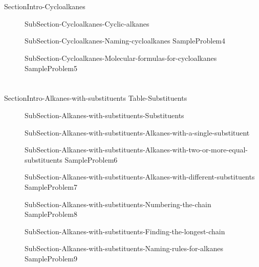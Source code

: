 \documentclass[main.tex]{subfiles}
\begin{document}
\section{\color{blue!30!black}{Cycloalkanes}}
{SectionIntro-Cycloalkanes}
\sloppy\begin{description}

\item[] {SubSection-Cycloalkanes-Cyclic-alkanes}
\item[]{SubSection-Cycloalkanes-Naming-cycloalkanes}
{SampleProblem4}
\item[]{SubSection-Cycloalkanes-Molecular-formulas-for-cycloalkanes}
{SampleProblem5}
\end{description}


 
\section{\color{blue!30!black}{Alkanes with substituents}}
{SectionIntro-Alkanes-with-substituents}
{Table-Substituents}
\sloppy\begin{description}
\item[]{SubSection-Alkanes-with-substituents-Substituents}
\item[]{SubSection-Alkanes-with-substituents-Alkanes-with-a-single-substituent}
\item[]{SubSection-Alkanes-with-substituents-Alkanes-with-two-or-more-equal-substituents}
{SampleProblem6}
\item[]{SubSection-Alkanes-with-substituents-Alkanes-with-different-substituents}
{SampleProblem7}
\item[]{SubSection-Alkanes-with-substituents-Numbering-the-chain}
{SampleProblem8}
\item[]{SubSection-Alkanes-with-substituents-Finding-the-longest-chain}
\item[]{SubSection-Alkanes-with-substituents-Naming-rules-for-alkanes}
{SampleProblem9}
\end{description}
\end{document}
